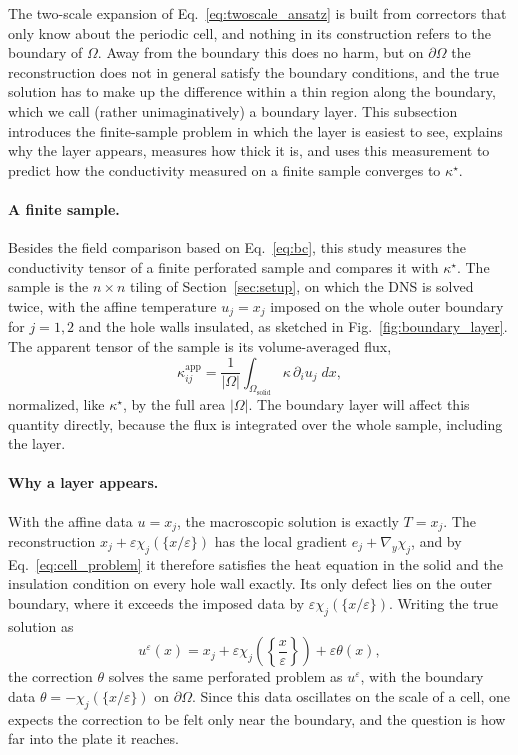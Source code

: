 \documentclass{article}
\begin{document}
The two-scale expansion of Eq.~\eqref{eq:twoscale_ansatz} is built from correctors
that only know about the periodic cell, and nothing in its construction refers to the
boundary of $\Omega$. Away from the boundary this does no harm, but on $\partial\Omega$
the reconstruction does not in general satisfy the boundary conditions, and the true
solution has to make up the difference within a thin region along the boundary, which we call (rather unimaginatively)
a boundary layer. This subsection introduces the finite-sample problem in which the layer is easiest
to see, explains why the layer appears, measures how thick it is, and uses this
measurement to predict how the conductivity measured on a finite sample converges to
$\kappa^{\star}$.

\paragraph{A finite sample.} Besides the field comparison based on Eq.~\eqref{eq:bc},
this study measures the conductivity tensor of a finite perforated sample and compares it
with $\kappa^{\star}$. The sample is the $n \times n$ tiling of Section~\ref{sec:setup}, on
which the DNS is solved twice, with the affine temperature $u_j = x_j$ imposed on the whole
outer boundary for $j = 1, 2$ and the hole walls insulated, as sketched in
Fig.~\ref{fig:boundary_layer}. The apparent tensor of the sample is its volume-averaged
flux,
\begin{equation}
  \label{eq:Kapp}
  \kappa^{\mathrm{app}}_{ij} = \frac{1}{|\Omega|} \int_{\Omega_{\mathrm{solid}}} \kappa\, \partial_i u_j \; dx ,
\end{equation}
normalized, like $\kappa^{\star}$, by the full area $|\Omega|$. The boundary layer will affect this quantity directly, 
because the flux is integrated over the whole sample, including the layer.

\paragraph{Why a layer appears.} With the affine data $u = x_j$, the macroscopic
solution is exactly $T = x_j$. The reconstruction
$x_j + \varepsilon \chi_j (\{ x / \varepsilon \})$ has the local gradient
$e_j + \nabla_y \chi_j$, and by Eq.~\eqref{eq:cell_problem} it therefore satisfies the
heat equation in the solid and the insulation condition on every hole wall exactly. Its
only defect lies on the outer boundary, where it exceeds the imposed data by
$\varepsilon \chi_j (\{ x / \varepsilon \})$. Writing the true solution as
\begin{equation}
  \label{eq:layer_split}
  u^{\varepsilon} (x) = x_j + \varepsilon \chi_j \left( \left\{ \frac{x}{\varepsilon}
  \right\} \right) + \varepsilon \theta (x),
\end{equation}
the correction $\theta$ solves the same perforated problem as $u^{\varepsilon}$, with the
boundary data $\theta = - \chi_j (\{ x / \varepsilon \})$ on $\partial \Omega$. Since this
data oscillates on the scale of a cell, one expects the correction to be felt only near
the boundary, and the question is how far into the plate it reaches.
\end{document}
